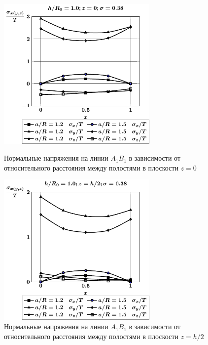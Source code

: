 \begin{figure}[h!]
\centering\footnotesize
\parbox[b]{7.5cm}{\centering\includegraphics[width=7.8cm]{cav31-a-h10-r10-z0-a1b1.pdf}
\caption{Нормальные напряжения на линии $A_1B_1$ в зависимости от относительного расстояния между полостями в плоскости $z=0$
\label{f:7:136}}}\hfil\hfil
\parbox[b]{7.5cm}{\centering\includegraphics[width=7.8cm]{cav31-a-h10-r10-z1-a1b1.pdf}
\caption{Нормальные напряжения на линии $A_1B_1$ в зависимости от относительного расстояния между полостями в плоскости $z=h/2$
\label{f:7:137}}}
\end{figure}

